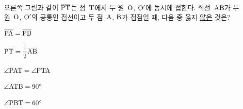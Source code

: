 \noindent\begin{minipage}[t]{0.58\linewidth}\vspace{0pt}\raggedright 오른쪽 그림과 같이 $\overline{\mathrm{PT}}$는 점~$\mathrm{T}$에서 두 원~$\mathrm{O}$, $\mathrm{O'}$에 동시에 접한다. 직선~$\mathrm{AB}$가 두 원~$\mathrm{O}$, $\mathrm{O'}$의 공통인 접선이고 두 점~$\mathrm{A}$, $\mathrm{B}$가 접점일 때, 다음 중 옳지 \underline{않은} 것은?\end{minipage}\hfill\begin{minipage}[t]{0.4\linewidth}\vspace{0pt}\centering \resizebox{\ifdim\width>\linewidth\linewidth\else\width\fi}{!}{}\end{minipage}\par
\begin{choicesii}{\rule[-3ex]{0pt}{8ex}$\overline{\mathrm{PA}}=\overline{\mathrm{PB}}$}{\rule[-3ex]{0pt}{8ex}$\overline{\mathrm{PT}}=\dfrac{1}{2}\overline{\mathrm{AB}}$}{\rule[-3ex]{0pt}{8ex}$\angle\mathrm{PAT}=\angle\mathrm{PTA}$}{\rule[-3ex]{0pt}{8ex}$\angle\mathrm{ATB}=90^\circ$}{\rule[-3ex]{0pt}{8ex}$\angle\mathrm{PBT}=60^\circ$}\end{choicesii}
